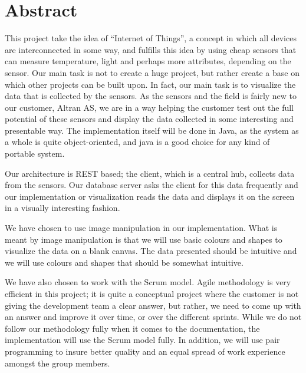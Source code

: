 \documentclass[../document.tex]{subfiles}
\begin{document}
\section*{Abstract}
This project take the idea of “Internet of Things”, a concept in which all devices are interconnected in some way, and fulfills this idea by using cheap sensors that can measure temperature, light and perhaps more attributes, depending on the sensor. Our main task is not to create a huge project, but rather create a base on which other projects can be built upon. In fact, our main task is to visualize the data that is collected by the sensors. As the sensors and the field is fairly new to our customer, Altran AS, we are in a way helping the customer test out the full potential of these sensors and display the data collected in some interesting and presentable way. The implementation itself will be done in Java, as the system as a whole is quite object-oriented, and java is a good choice for any kind of portable system.

Our architecture is REST based; the client, which is a central hub, collects data from the sensors. Our database server asks the client for this data frequently and our implementation or visualization reads the data and displays it on the screen in a visually interesting fashion.

We have chosen to use image manipulation in our implementation. What is meant by image manipulation is that we will use basic colours and shapes to visualize the data on a blank canvas. The data presented should be intuitive and we will use colours and shapes that should be somewhat intuitive.

We have also chosen to work with the Scrum model. Agile methodology is very efficient in this project; it is quite a conceptual project where the customer is not giving the development team a clear answer, but rather, we need to come up with an answer and improve it over time, or over the different sprints. While we do not follow our methodology fully when it comes to the documentation, the implementation will use the Scrum model fully. In addition, we will use pair programming to insure better quality and an equal spread of work experience amongst the group members.
\end{document}
